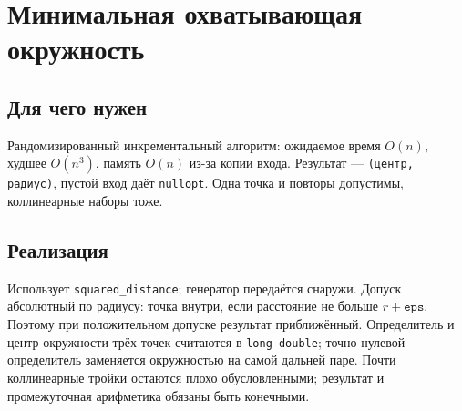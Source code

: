 \section{Минимальная охватывающая окружность}
\subsection*{Для чего нужен}
Рандомизированный инкрементальный алгоритм: ожидаемое время $O(n)$,
худшее $O(n^3)$, память $O(n)$ из-за копии входа. Результат ---
\texttt{(центр, радиус)}, пустой вход даёт \texttt{nullopt}.
Одна точка и повторы допустимы, коллинеарные наборы тоже.
\subsection*{Реализация}
Использует \texttt{squared\_distance}; генератор передаётся снаружи.
Допуск абсолютный по радиусу: точка внутри, если расстояние не больше
$r+\texttt{eps}$. Поэтому при положительном допуске результат приближённый.
Определитель и центр окружности трёх точек считаются в \texttt{long double};
точно нулевой определитель заменяется окружностью на самой дальней паре.
Почти коллинеарные тройки остаются плохо обусловленными; результат и
промежуточная арифметика обязаны быть конечными.
